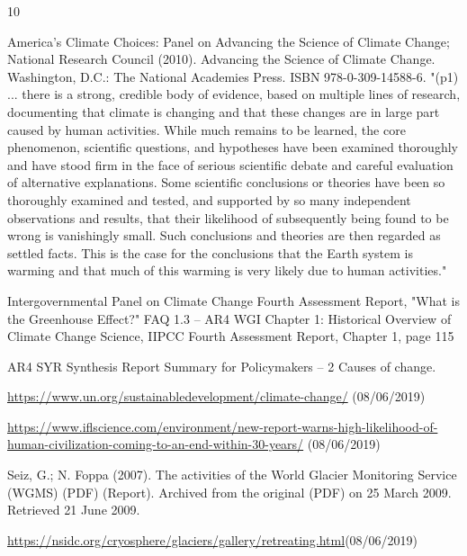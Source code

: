 \documentclass[12pt, a4paper]{report}
\begin{document}
	
	\begin{thebibliography} {10}
		
		 America's Climate Choices: Panel on Advancing the Science of Climate Change; National Research Council (2010). Advancing the Science of Climate Change. Washington, D.C.: The National Academies Press. ISBN 978-0-309-14588-6. "(p1) ... there is a strong, credible body of evidence, based on multiple lines of research, documenting that climate is changing and that these changes are in large part caused by human activities. While much remains to be learned, the core phenomenon, scientific questions, and hypotheses have been examined thoroughly and have stood firm in the face of serious scientific debate and careful evaluation of alternative explanations.  Some scientific conclusions or theories have been so thoroughly examined and tested, and supported by so many independent observations and results, that their likelihood of subsequently being found to be wrong is vanishingly small. Such conclusions and theories are then regarded as settled facts. This is the case for the conclusions that the Earth system is warming and that much of this warming is very likely due to human activities."
		
		 Intergovernmental Panel on Climate Change Fourth Assessment Report, "What is the Greenhouse Effect?" FAQ 1.3 – AR4 WGI Chapter 1: Historical Overview of Climate Change Science, IIPCC Fourth Assessment Report, Chapter 1, page 115
		
		 AR4 SYR Synthesis Report Summary for Policymakers – 2 Causes of change.
		
		  \url{https://www.un.org/sustainabledevelopment/climate-change/} (08/06/2019)
				
		 \url{https://www.iflscience.com/environment/new-report-warns-high-likelihood-of-human-civilization-coming-to-an-end-within-30-years/} (08/06/2019)
		
		 Seiz, G.; N. Foppa (2007). The activities of the World Glacier Monitoring Service (WGMS) (PDF) (Report). Archived from the original (PDF) on 25 March 2009. Retrieved 21 June 2009.
		
		 \url{https://nsidc.org/cryosphere/glaciers/gallery/retreating.html}(08/06/2019)
		

\end{thebibliography}
\end{document}
